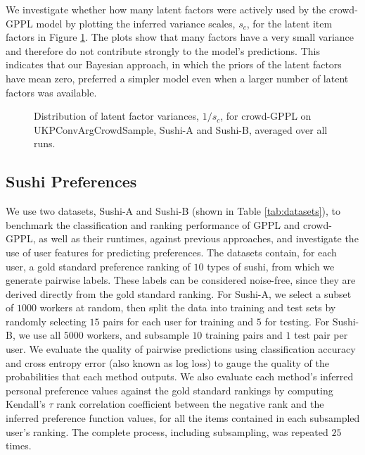 We investigate whether how many latent factors were actively used by the crowd-GPPL model
by plotting the inferred variance scales, $s_c$, for the latent item factors in 
Figure \ref{fig:latent_factor_variance}. The plots show
that many factors have a very small variance and therefore do not contribute strongly 
to the model's predictions. This indicates that our Bayesian approach, in which the priors
of the latent factors have mean zero, preferred a simpler model even when a larger number
of latent factors was available.
\begin{figure}
\subfloat[UKPConvArgCrowdSample]{
}
\caption{
Distribution of latent factor variances, $1/s_c$, for crowd-GPPL on UKPConvArgCrowdSample, Sushi-A and Sushi-B, averaged over all runs.
}
\label{fig:latent_factor_variance}
\end{figure}

\subsection{Sushi Preferences}\label{sec:sushi}

We use two datasets, Sushi-A and Sushi-B (shown in Table \ref{tab:datasets}),
to benchmark the classification and ranking performance of GPPL and crowd-GPPL, 
as well as their runtimes, against previous approaches, 
and investigate the use of user features for predicting preferences.
The datasets contain, for each user, a gold standard preference ranking of $10$ types of sushi,
from which we generate pairwise labels. These labels can be considered noise-free, since
they are derived directly from the gold standard ranking.  
For Sushi-A, we select a subset of $1000$ workers at random, then 
split the data into training and test sets by randomly
selecting $15$ pairs for each user for training and $5$ for testing. 
For Sushi-B, we use all $5000$ workers, and subsample $10$ training pairs and $1$ test pair
per user.
We evaluate the quality of pairwise predictions using classification accuracy and cross entropy 
error (also known as log loss) to gauge the quality of the probabilities that each method outputs.
We also evaluate each method's inferred personal preference values
against the gold standard rankings by computing Kendall's $\tau$ rank correlation
coefficient between the negative rank and the inferred preference function values,
for all the items contained in each subsampled user's ranking.
The complete process, including subsampling, was repeated $25$ times.

